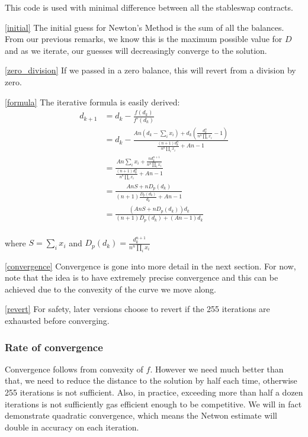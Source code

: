\documentclass[
]{article}
\begin{document}
This code is used with minimal difference between all the stableswap
contracts.

\ref{initial} The initial guess for Newton's Method is the sum of all
the balances. From our previous remarks, we know this is the maximum
possible value for \(D\) and as we iterate, our guesses will
decreasingly converge to the solution.

\ref{zero_division} If we passed in a zero balance, this will revert
from a division by zero.

\ref{formula} The iterative formula is easily derived: \[\begin{aligned}
d_{k+1} &= d_k - \frac{f(d_k)}{f'(d_k)} \\
&= d_k - \frac{A n (d_k - \sum_i x_i)  + d_k(\frac{d_k^{n}}{n^n \prod_i x_i} - 1)}{\frac{(n+1)d_k^n}{n^n \prod_i x_i} + An - 1} \\
&= \frac{An\sum_i x_i + \frac{nd_k^{n+1}}{n^n \prod_i x_i}}{\frac{(n+1)d_k^n}{n^n\prod_i x_i} + An - 1} \\
&= \frac{AnS + nD_p(d_k)}{(n+1)\frac{D_p(d_k)}{d_k} + An - 1} \\
&= \frac{(AnS + nD_p(d_k))d_k}{(n+1)D_p(d_k) + (An-1)d_k}\\
\end{aligned}\]

where \(S = \sum_i x_i\) and
\(D_p(d_k) = \frac{d_k^{n+1}}{n^n \prod_i x_i}\)

\ref{convergence} Convergence is gone into more detail in the next
section. For now, note that the idea is to have extremely precise
convergence and this can be achieved due to the convexity of the curve
we move along.

\ref{revert} For safety, later versions choose to revert if the 255
iterations are exhausted before converging.

\hypertarget{rate-of-convergence}{%
\subsubsection{Rate of convergence}\label{rate-of-convergence}}

Convergence follows from convexity of \(f\). However we need much better
than that, we need to reduce the distance to the solution by half each
time, otherwise 255 iterations is not sufficient. Also, in practice,
exceeding more than half a dozen iterations is not sufficiently gas
efficient enough to be competitive. We will in fact demonstrate
quadratic convergence, which means the Netwon estimate will double in
accuracy on each iteration.
\end{document}
